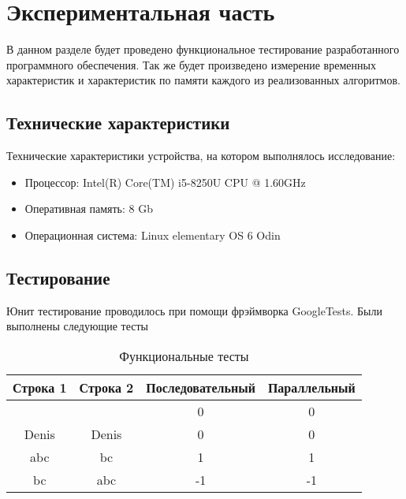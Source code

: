 \chapter{Экспериментальная часть}

    В данном разделе будет проведено функциональное тестирование разработанного программного обеспечения. Так же будет произведено измерение временных характеристик и характеристик по памяти каждого из реализованных алгоритмов.

    \section{Технические характеристики}
    
        Технические характеристики устройства, на котором выполнялось исследование:
        
        \begin{itemize}
            \item Процессор: Intel(R) Core(TM) i5-8250U CPU @ 1.60GHz \cite{intel}
            \item Оперативная память: 8 Gb
            \item Операционная система: Linux\cite{kernel} elementary OS 6 Odin \cite{elemos}
        \end{itemize}
    
    \section{Тестирование}
    
        Юнит тестирование проводилось при помощи фрэймворка GoogleTests\cite{gtests}. Были выполнены следующие тесты
        
        \begin{table}[]
            \centering
            \caption{Функциональные тесты}
            \begin{tabular}{|c|c|c|c|}
\hline \textbf{Строка 1} & \textbf{Строка 2} & \textbf{Последовательный} & \textbf{Параллельный}  \\
\hline &  & 0 & 0 \\
\hline Denis & Denis & 0 & 0 \\
\hline abc & bc & 1 & 1 \\
\hline bc & abc & -1 & -1 \\
\hline
            \end{tabular}
            \label{tab:my_label}
        \end{table}
        
